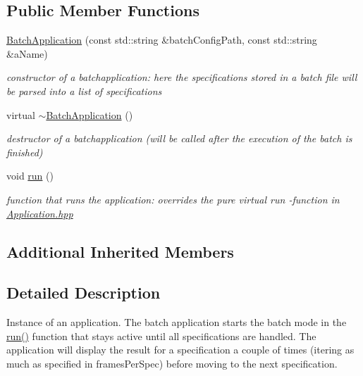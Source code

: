 \subsection*{Public Member Functions}
\begin{DoxyCompactItemize}
\item 
\hyperlink{classBatchApplication_ad95d865cf89fe8591f600ffdcf2fd31b}{Batch\+Application} (const std\+::string \&batch\+Config\+Path, const std\+::string \&a\+Name)
\begin{DoxyCompactList}\small\item\em constructor of a batchapplication\+: here the specifications stored in a batch file will be parsed into a list of specifications \end{DoxyCompactList}\item 
virtual \hyperlink{classBatchApplication_a5112919cc14101d58ec2a9f6b884af79}{$\sim$\+Batch\+Application} ()\hypertarget{classBatchApplication_a5112919cc14101d58ec2a9f6b884af79}{}\label{classBatchApplication_a5112919cc14101d58ec2a9f6b884af79}

\begin{DoxyCompactList}\small\item\em destructor of a batchapplication (will be called after the execution of the batch is finished) \end{DoxyCompactList}\item 
void \hyperlink{classBatchApplication_a5338e7513a806b5e751f92d0704d0f8b}{run} ()\hypertarget{classBatchApplication_a5338e7513a806b5e751f92d0704d0f8b}{}\label{classBatchApplication_a5338e7513a806b5e751f92d0704d0f8b}

\begin{DoxyCompactList}\small\item\em function that runs the application\+: overrides the pure virtual run -\/function in \hyperlink{Application_8hpp_source}{Application.\+hpp} \end{DoxyCompactList}\end{DoxyCompactItemize}
\subsection*{Additional Inherited Members}


\subsection{Detailed Description}
Instance of an application. The batch application starts the batch mode in the \hyperlink{classBatchApplication_a5338e7513a806b5e751f92d0704d0f8b}{run()} function that stays active until all specifications are handled. The application will display the result for a specification a couple of times (itering as much as specified in frames\+Per\+Spec) before moving to the next specification. 

